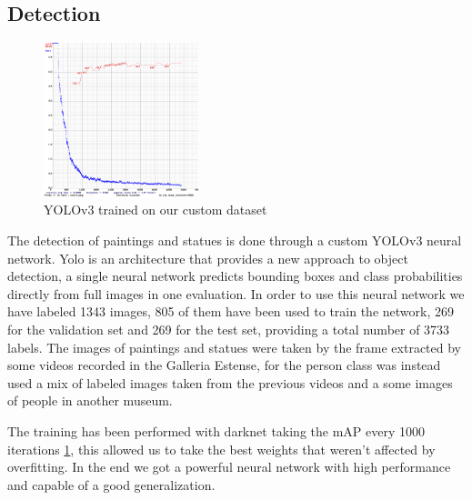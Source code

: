 \subsection{Detection}

\begin{figure}[h!]
    \centering
        \includegraphics[width=0.4\textwidth]{pictures/painting_detection/training-v3.png}
    \caption{YOLOv3 trained on our custom dataset}
    \label{fig:training-v3}
\end{figure}



The detection of paintings and statues is done through a custom YOLOv3 neural network.\cite{yolov3}
Yolo is an architecture that provides a new approach to object detection, a single neural network predicts bounding boxes and class probabilities directly from full images in one evaluation.
In order to use this neural network we have labeled 1343 images, 805 of them have been used to train the network, 269 for the validation set and 269 for the test set, providing a total number of 3733 labels. The images of paintings and statues were taken by the frame extracted by some videos recorded in the Galleria Estense, for the person class was instead used a mix of labeled images taken from the previous videos and a some images of people in another museum.


The training has been performed with darknet \cite{darknet} taking the mAP every 1000 iterations \ref{fig:training-v3}, this allowed us to take the best weights that weren't affected by overfitting.
In the end we got a powerful neural network with high performance and capable of a good generalization.

